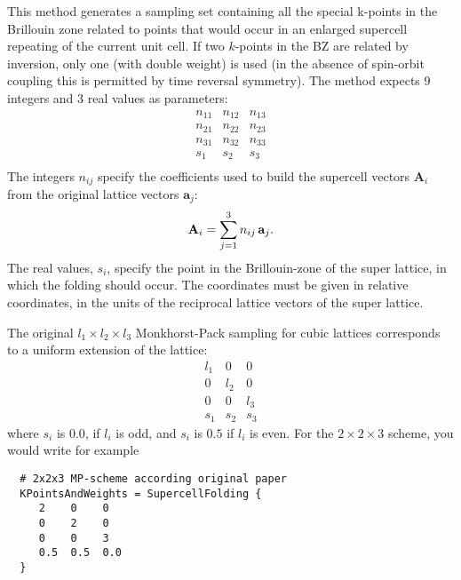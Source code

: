This method generates a sampling set containing all the special
k-points in the Brillouin zone related to points that would occur in
an enlarged supercell repeating of the current unit cell.  If two
$k$-points in the BZ are related by inversion, only one (with double
weight) is used (in the absence of spin-orbit coupling this is
permitted by time reversal symmetry). The 
method expects 9 integers and 3 real values as parameters:
\begin{equation*}
  \begin{array}{ccc}
    n_{11} & n_{12} & n_{13} \\
    n_{21} & n_{22} & n_{23} \\
    n_{31} & n_{32} & n_{33} \\
    s_{1} & s_{2}   & s_{3} \\
  \end{array}
\end{equation*}
The integers $n_{ij}$ specify the coefficients used to build the
supercell vectors $\mathbf{A}_i$ from the original lattice vectors
$\mathbf{a}_j$:
\begin{equation*}
  \mathbf{A}_i = \sum_{j=1}^3 n_{ij}\, \mathbf{a}_j
  \text.
\end{equation*}
The real values, $s_i$, specify the point in the Brillouin-zone of the
super lattice, in which the folding should occur. The coordinates must
be given in relative coordinates, in the units of the reciprocal
lattice vectors of the super lattice.

The original $l_1\times l_2\times l_3$ Monkhorst-Pack
sampling \cite{monkhorst-prb-13-5188} for
cubic lattices corresponds to a uniform extension of the lattice:
\begin{equation*}
  \begin{array}{ccc}
    l_1 & 0 & 0\\
    0 & l_2 & 0 \\
    0 & 0& l_3 \\
    s_1 & s_2 & s_3
  \end{array}
\end{equation*}
where $s_i$ is $0.0$, if $l_i$ is odd, and $s_i$ is $0.5$ if $l_i$ is
even. For the $2\times2\times3$ scheme, you would write for example
\begin{verbatim}
  # 2x2x3 MP-scheme according original paper
  KPointsAndWeights = SupercellFolding {
     2    0    0
     0    2    0
     0    0    3
     0.5  0.5  0.0
  }
\end{verbatim}

